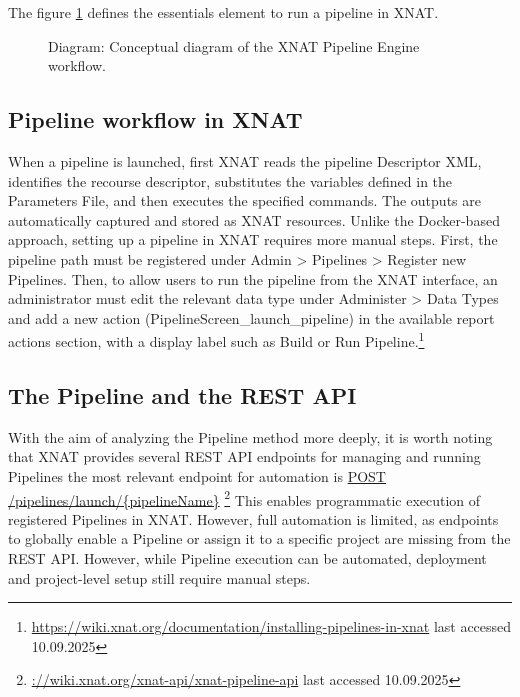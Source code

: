 The figure \ref{fig:pipeline} defines the essentials element to run a pipeline in XNAT. 



\begin{figure}[H]
    \centering
    \def\svgwidth{0.9\linewidth}
    
    \caption{Diagram: Conceptual diagram of the XNAT Pipeline Engine workflow.}
    \label{fig:pipeline}
\end{figure}






\subsection{Pipeline workflow in XNAT}
When a pipeline is launched, first XNAT reads the pipeline Descriptor XML, identifies the recourse descriptor, substitutes the variables defined in the Parameters File, and then executes the specified commands. The outputs are automatically captured and stored as XNAT resources.
Unlike the Docker-based approach, setting up a pipeline in XNAT requires more manual steps. First, the pipeline path must be registered under Admin > Pipelines > Register new Pipelines. Then, to allow users to run the pipeline from the XNAT interface, an administrator must edit the relevant data type under Administer > Data Types and add a new action (PipelineScreen\_launch\_pipeline) in the available report actions section, with a display label such as Build or Run Pipeline.\footnote{\url{https://wiki.xnat.org/documentation/installing-pipelines-in-xnat} last accessed 10.09.2025}
\normalsize












\subsection{The Pipeline and the REST API}
With the aim of analyzing the Pipeline method more deeply, it is worth noting that XNAT provides several REST API endpoints for managing and running Pipelines the most relevant endpoint for automation is \url{POST /pipelines/launch/{pipelineName}} \footnote{\url{://wiki.xnat.org/xnat-api/xnat-pipeline-api} last accessed 10.09.2025}
This enables programmatic execution of registered Pipelines in XNAT. However, full automation is limited, as endpoints to globally enable a Pipeline or assign it to a specific project are missing from the REST API. However, while Pipeline execution can be automated, deployment and project-level setup still require manual steps.




